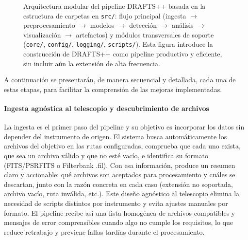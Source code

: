 \begin{figure}[H]
{}
\endgroup
\caption{Arquitectura modular del pipeline DRAFTS++ basada en la estructura de carpetas en \texttt{src/}: flujo principal (ingesta $\to$ preprocesamiento $\to$ modelos $\to$ detección $\to$ análisis $\to$ visualización $\to$ artefactos) y módulos transversales de soporte (\texttt{core/}, \texttt{config/}, \texttt{logging/}, \texttt{scripts/}). Esta figura introduce la construcción de DRAFTS++ como pipeline productivo y eficiente, sin incluir aún la extensión de alta frecuencia.}
\label{fig:workflow-src}
\end{figure}

A continuación se presentarán, de manera secuencial y detallada, cada una de estas etapas, para facilitar la comprensión de las mejoras implementadas.

\paragraph{Ingesta agnóstica al telescopio y descubrimiento de archivos}

La ingesta es el primer paso del pipeline y su objetivo es incorporar los datos sin depender del instrumento de origen. El sistema busca automáticamente los archivos del objetivo en las rutas configuradas, comprueba que cada uno exista, que sea un archivo válido y que no esté vacío, e identifica su formato (FITS/PSRFITS o Filterbank .fil). Con esa información, produce un resumen claro y accionable: qué archivos son aceptados para procesamiento y cuáles se descartan, junto con la razón concreta en cada caso (extensión no soportada, archivo vacío, ruta inválida, etc.). Este diseño agnóstico al telescopio elimina la necesidad de scripts distintos por instrumento y evita ajustes manuales por formato. El pipeline recibe así una lista homogénea de archivos compatibles y mensajes de error comprensibles cuando algo no cumple los requisitos, lo que reduce retrabajo y previene fallas tardías durante el procesamiento.

